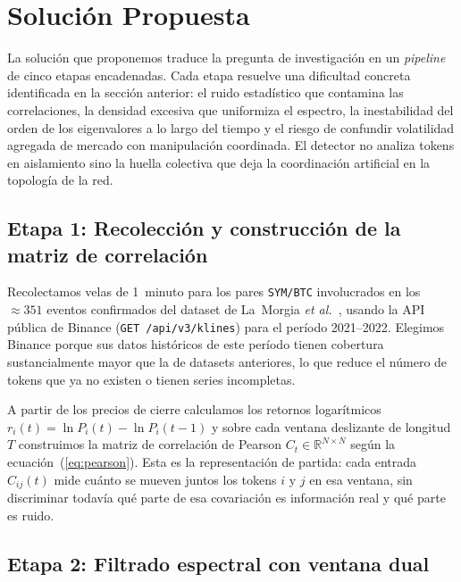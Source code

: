 \section{Solución Propuesta}
\label{sec:solucion}



La solución que proponemos traduce la pregunta de investigación en un
\emph{pipeline} de cinco etapas encadenadas. Cada etapa resuelve una
dificultad concreta identificada en la sección anterior: el ruido
estadístico que contamina las correlaciones, la densidad excesiva que
uniformiza el espectro, la inestabilidad del orden de los eigenvalores
a lo largo del tiempo y el riesgo de confundir volatilidad agregada de
mercado con manipulación coordinada. El detector no analiza tokens en
aislamiento sino la huella colectiva que deja la coordinación artificial
en la topología de la red.

\subsection{Etapa 1: Recolección y construcción de la matriz de correlación}

Recolectamos velas de 1~minuto para los pares \texttt{SYM/BTC}
involucrados en los ${\approx}351$ eventos confirmados del dataset de
La~Morgia \textit{et al.}~\cite{lamorgia2020}, usando la API pública de
Binance (\texttt{GET /api/v3/klines}) para el período 2021--2022.
Elegimos Binance porque sus datos históricos de este período tienen
cobertura sustancialmente mayor que la de datasets anteriores, lo que
reduce el número de tokens que ya no existen o tienen series
incompletas.

A partir de los precios de cierre calculamos los retornos logarítmicos
$r_i(t) = \ln P_i(t) - \ln P_i(t-1)$ y sobre cada ventana deslizante
de longitud $T$ construimos la matriz de correlación de Pearson
$C_t \in \mathbb{R}^{N \times N}$ según la ecuación~(\ref{eq:pearson}).
Esta es la representación de partida: cada entrada $C_{ij}(t)$ mide
cuánto se mueven juntos los tokens $i$ y $j$ en esa ventana, sin
discriminar todavía qué parte de esa covariación es información real y
qué parte es ruido.

\subsection{Etapa 2: Filtrado espectral con ventana dual}

